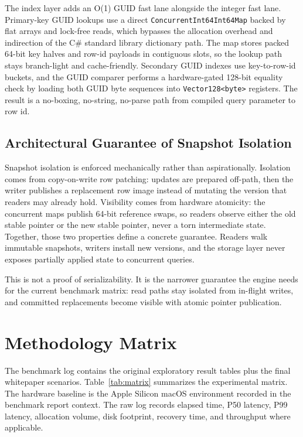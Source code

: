 \documentclass[11pt]{article}
\begin{document}
The index layer adds an O(1) GUID fast lane alongside the integer fast lane. Primary-key GUID lookups use a direct \texttt{ConcurrentInt64Int64Map} backed by flat arrays and lock-free reads, which bypasses the allocation overhead and indirection of the C\# standard library dictionary path. The map stores packed 64-bit key halves and row-id payloads in contiguous slots, so the lookup path stays branch-light and cache-friendly. Secondary GUID indexes use key-to-row-id buckets, and the GUID comparer performs a hardware-gated 128-bit equality check by loading both GUID byte sequences into \texttt{Vector128<byte>} registers. The result is a no-boxing, no-string, no-parse path from compiled query parameter to row id.

\subsection{Architectural Guarantee of Snapshot Isolation}
Snapshot isolation is enforced mechanically rather than aspirationally. Isolation comes from copy-on-write row patching: updates are prepared off-path, then the writer publishes a replacement row image instead of mutating the version that readers may already hold. Visibility comes from hardware atomicity: the concurrent maps publish 64-bit reference swaps, so readers observe either the old stable pointer or the new stable pointer, never a torn intermediate state. Together, those two properties define a concrete guarantee. Readers walk immutable snapshots, writers install new versions, and the storage layer never exposes partially applied state to concurrent queries.

This is not a proof of serializability. It is the narrower guarantee the engine needs for the current benchmark matrix: read paths stay isolated from in-flight writes, and committed replacements become visible with atomic pointer publication.

\section{Methodology Matrix}
The benchmark log contains the original exploratory result tables plus the final whitepaper scenarios. Table~\ref{tab:matrix} summarizes the experimental matrix. The hardware baseline is the Apple Silicon macOS environment recorded in the benchmark report context. The raw log records elapsed time, P50 latency, P99 latency, allocation volume, disk footprint, recovery time, and throughput where applicable.
\end{document}
